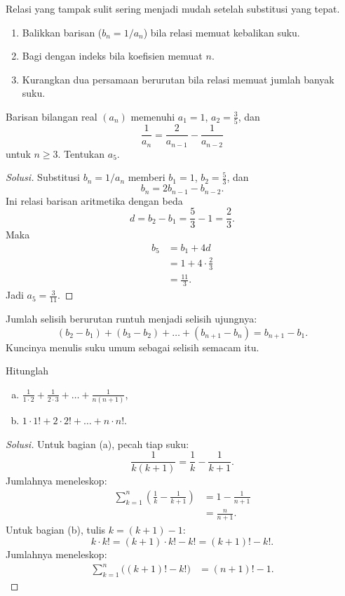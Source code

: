 \documentclass[12pt]{scrartcl}
\begin{document}
\begin{fact}
Relasi yang tampak sulit sering menjadi mudah setelah substitusi yang tepat.
\begin{enumerate}
    \item Balikkan barisan ($b_n = 1/a_n$) bila relasi memuat kebalikan suku.
    \item Bagi dengan indeks bila koefisien memuat $n$.
    \item Kurangkan dua persamaan berurutan bila relasi memuat jumlah banyak suku.
\end{enumerate}
\end{fact}

\begin{example}
Barisan bilangan real $(a_n)$ memenuhi $a_1 = 1$, $a_2 = \frac{3}{5}$, dan
\[ \frac{1}{a_n} = \frac{2}{a_{n-1}} - \frac{1}{a_{n-2}} \]
untuk $n \ge 3$. Tentukan $a_5$.
\end{example}
\begin{proof}[Solusi]
\renewcommand{\qedsymbol}{$\blacksquare$}
Substitusi $b_n = 1/a_n$ memberi $b_1 = 1$, $b_2 = \frac{5}{3}$, dan
\[ b_n = 2b_{n-1} - b_{n-2}. \]
Ini relasi barisan aritmetika dengan beda
\[ d = b_2 - b_1 = \frac{5}{3} - 1 = \frac{2}{3}. \]
Maka
\begin{align*}
b_5 &= b_1 + 4d \\
&= 1 + 4 \cdot \frac{2}{3} \\
&= \frac{11}{3}.
\end{align*}
Jadi $a_5 = \frac{3}{11}$.
\end{proof}

\begin{fact}[Teleskoping]
Jumlah selisih berurutan runtuh menjadi selisih ujungnya:
\[ (b_2 - b_1) + (b_3 - b_2) + \dots + (b_{n+1} - b_n) = b_{n+1} - b_1. \]
Kuncinya menulis suku umum sebagai selisih semacam itu.
\end{fact}

\begin{example}
Hitunglah
\begin{enumerate}[(a)]
    \item $\frac{1}{1 \cdot 2} + \frac{1}{2 \cdot 3} + \dots + \frac{1}{n(n+1)}$,
    \item $1 \cdot 1! + 2 \cdot 2! + \dots + n \cdot n!$.
\end{enumerate}
\end{example}
\begin{proof}[Solusi]
\renewcommand{\qedsymbol}{$\blacksquare$}
Untuk bagian (a), pecah tiap suku:
\[ \frac{1}{k(k+1)} = \frac{1}{k} - \frac{1}{k+1}. \]
Jumlahnya meneleskop:
\begin{align*}
\sum_{k=1}^{n} \left( \frac{1}{k} - \frac{1}{k+1} \right)
&= 1 - \frac{1}{n+1} \\
&= \frac{n}{n+1}.
\end{align*}
Untuk bagian (b), tulis $k = (k+1) - 1$:
\[ k \cdot k! = (k+1) \cdot k! - k! = (k+1)! - k!. \]
Jumlahnya meneleskop:
\begin{align*}
\sum_{k=1}^{n} \bigl( (k+1)! - k! \bigr)
&= (n+1)! - 1.
\end{align*}
\end{proof}
\end{document}
